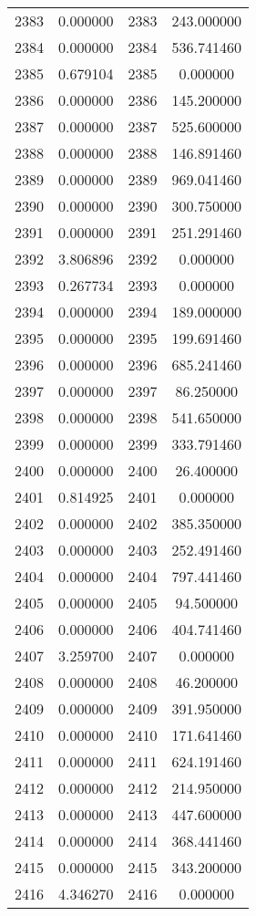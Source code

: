 \documentclass[12pt]{article}
\begin{document}
\begin{longtable}{@{}cccc@{}}
2383 & 0.000000 & 2383 & 243.000000 \\
2384 & 0.000000 & 2384 & 536.741460 \\
2385 & 0.679104 & 2385 & 0.000000 \\
2386 & 0.000000 & 2386 & 145.200000 \\
2387 & 0.000000 & 2387 & 525.600000 \\
2388 & 0.000000 & 2388 & 146.891460 \\
2389 & 0.000000 & 2389 & 969.041460 \\
2390 & 0.000000 & 2390 & 300.750000 \\
2391 & 0.000000 & 2391 & 251.291460 \\
2392 & 3.806896 & 2392 & 0.000000 \\
2393 & 0.267734 & 2393 & 0.000000 \\
2394 & 0.000000 & 2394 & 189.000000 \\
2395 & 0.000000 & 2395 & 199.691460 \\
2396 & 0.000000 & 2396 & 685.241460 \\
2397 & 0.000000 & 2397 & 86.250000 \\
2398 & 0.000000 & 2398 & 541.650000 \\
2399 & 0.000000 & 2399 & 333.791460 \\
2400 & 0.000000 & 2400 & 26.400000 \\
2401 & 0.814925 & 2401 & 0.000000 \\
2402 & 0.000000 & 2402 & 385.350000 \\
2403 & 0.000000 & 2403 & 252.491460 \\
2404 & 0.000000 & 2404 & 797.441460 \\
2405 & 0.000000 & 2405 & 94.500000 \\
2406 & 0.000000 & 2406 & 404.741460 \\
2407 & 3.259700 & 2407 & 0.000000 \\
2408 & 0.000000 & 2408 & 46.200000 \\
2409 & 0.000000 & 2409 & 391.950000 \\
2410 & 0.000000 & 2410 & 171.641460 \\
2411 & 0.000000 & 2411 & 624.191460 \\
2412 & 0.000000 & 2412 & 214.950000 \\
2413 & 0.000000 & 2413 & 447.600000 \\
2414 & 0.000000 & 2414 & 368.441460 \\
2415 & 0.000000 & 2415 & 343.200000 \\
2416 & 4.346270 & 2416 & 0.000000 \\

\end{longtable}
\end{document}
